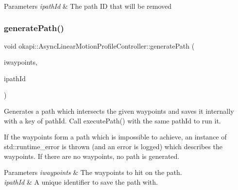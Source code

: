 \begin{DoxyParams}{Parameters}
{\em ipath\+Id} & The path ID that will be removed \\
\hline
\end{DoxyParams}
\mbox{\label{classokapi_1_1AsyncLinearMotionProfileController_aef2acba51417d929695ca38e309b0f6c}} 
\subsubsection{\texorpdfstring{generatePath()}{generatePath()}\hspace{0.1cm}{\footnotesize\ttfamily [1/2]}}
{\footnotesize\ttfamily void okapi\+::\+Async\+Linear\+Motion\+Profile\+Controller\+::generate\+Path (\begin{DoxyParamCaption}\item[{std\+::initializer\+\_\+list$<$ Q\+Length $>$}]{iwaypoints,  }\item[{const std\+::string \&}]{ipath\+Id }\end{DoxyParamCaption})}

Generates a path which intersects the given waypoints and saves it internally with a key of path\+Id. Call execute\+Path() with the same path\+Id to run it.

If the waypoints form a path which is impossible to achieve, an instance of std\+::runtime\+\_\+error is thrown (and an error is logged) which describes the waypoints. If there are no waypoints, no path is generated.


\begin{DoxyParams}{Parameters}
{\em iwaypoints} & The waypoints to hit on the path. \\
\hline
{\em ipath\+Id} & A unique identifier to save the path with. \\
\hline
\end{DoxyParams}
\mbox{\label{classokapi_1_1AsyncLinearMotionProfileController_ada94ccc2679082ea7fb2317458ca80d1}} 
